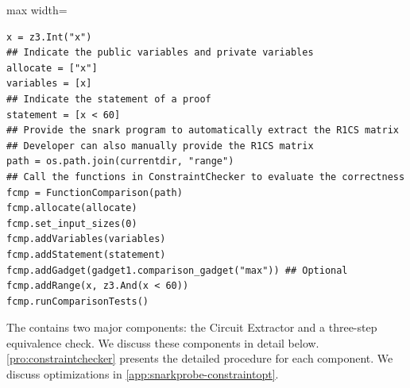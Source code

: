 
\begin{ZZlisting}[H]
\caption{An example of \ConstraintChecker}
\centering
\begin{adjustbox}{max width=\textwidth}
\begin{CenteredBox}
\begin{minipage}{0.96\textwidth}
\begin{lstlisting}
x = z3.Int("x")
## Indicate the public variables and private variables
allocate = ["x"]
variables = [x]
## Indicate the statement of a proof
statement = [x < 60]
## Provide the snark program to automatically extract the R1CS matrix
## Developer can also manually provide the R1CS matrix
path = os.path.join(currentdir, "range")
## Call the functions in ConstraintChecker to evaluate the correctness
fcmp = FunctionComparison(path)
fcmp.allocate(allocate)
fcmp.set_input_sizes(0)
fcmp.addVariables(variables)
fcmp.addStatement(statement)
fcmp.addGadget(gadget1.comparison_gadget("max")) ## Optional
fcmp.addRange(x, z3.And(x < 60))
fcmp.runComparisonTests()
\end{lstlisting}
\end{minipage}
\end{CenteredBox}
\end{adjustbox}
\label{list:constraintchecker}
\end{ZZlisting}

 The \ConstraintChecker contains two major components: the Circuit Extractor and a three-step equivalence check. We discuss these components in detail below. \autoref{pro:constraintchecker} presents the detailed procedure for each component. We discuss optimizations in \autoref{app:snarkprobe-constraintopt}.


